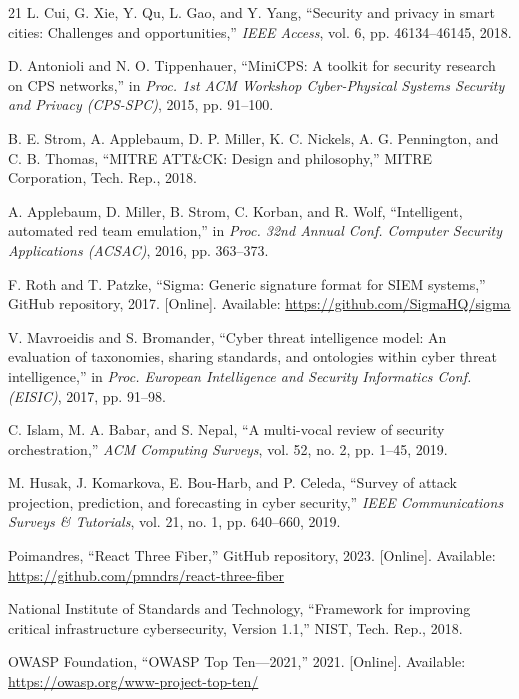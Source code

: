 \documentclass[conference,10pt]{IEEEtran}
\begin{document}
\begin{thebibliography}{21}
L. Cui, G. Xie, Y. Qu, L. Gao, and Y. Yang, ``Security and privacy in smart cities: Challenges and opportunities,'' \textit{IEEE Access}, vol. 6, pp. 46134--46145, 2018.

D. Antonioli and N. O. Tippenhauer, ``MiniCPS: A toolkit for security research on CPS networks,'' in \textit{Proc. 1st ACM Workshop Cyber-Physical Systems Security and Privacy (CPS-SPC)}, 2015, pp. 91--100.

B. E. Strom, A. Applebaum, D. P. Miller, K. C. Nickels, A. G. Pennington, and C. B. Thomas, ``MITRE ATT\&CK: Design and philosophy,'' MITRE Corporation, Tech. Rep., 2018.

A. Applebaum, D. Miller, B. Strom, C. Korban, and R. Wolf, ``Intelligent, automated red team emulation,'' in \textit{Proc. 32nd Annual Conf. Computer Security Applications (ACSAC)}, 2016, pp. 363--373.

F. Roth and T. Patzke, ``Sigma: Generic signature format for SIEM systems,'' GitHub repository, 2017. [Online]. Available: \url{https://github.com/SigmaHQ/sigma}

V. Mavroeidis and S. Bromander, ``Cyber threat intelligence model: An evaluation of taxonomies, sharing standards, and ontologies within cyber threat intelligence,'' in \textit{Proc. European Intelligence and Security Informatics Conf. (EISIC)}, 2017, pp. 91--98.

C. Islam, M. A. Babar, and S. Nepal, ``A multi-vocal review of security orchestration,'' \textit{ACM Computing Surveys}, vol. 52, no. 2, pp. 1--45, 2019.

M. Husak, J. Komarkova, E. Bou-Harb, and P. Celeda, ``Survey of attack projection, prediction, and forecasting in cyber security,'' \textit{IEEE Communications Surveys \& Tutorials}, vol. 21, no. 1, pp. 640--660, 2019.

Poimandres, ``React Three Fiber,'' GitHub repository, 2023. [Online]. Available: \url{https://github.com/pmndrs/react-three-fiber}

National Institute of Standards and Technology, ``Framework for improving critical infrastructure cybersecurity, Version 1.1,'' NIST, Tech. Rep., 2018.

OWASP Foundation, ``OWASP Top Ten---2021,'' 2021. [Online]. Available: \url{https://owasp.org/www-project-top-ten/}

\end{thebibliography}
\end{document}
